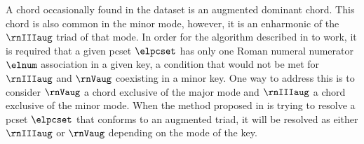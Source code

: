 
A chord occasionally found in the dataset is an augmented
dominant chord. This chord is also common in the minor mode,
however, it is an enharmonic of the $\rnIIIaug$ triad of
that mode. In order for the algorithm described in
to work, it is required that a given \gls{pcset} $\elpcset$
has only one Roman numeral numerator $\elnum$ association in
a given key, a condition that would not be met for
$\rnIIIaug$ and $\rnVaug$ coexisting in a minor key. One way
to address this is to consider $\rnVaug$ a chord exclusive
of the major mode and $\rnIIIaug$ a chord exclusive of the
minor mode. When the method proposed in
is trying to resolve a \gls{pcset} $\elpcset$ that conforms
to an augmented triad, it will be resolved as either
$\rnIIIaug$ or $\rnVaug$ depending on the mode of the key.
